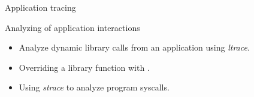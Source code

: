 \setuplabframe
{Application tracing}
{
  Analyzing of application interactions
  \begin{itemize}
    \item Analyze dynamic library calls from an application using
            {\em ltrace}.
    \item Overriding a library function with .
    \item Using {\em strace} to analyze program syscalls.
  \end{itemize}
}
